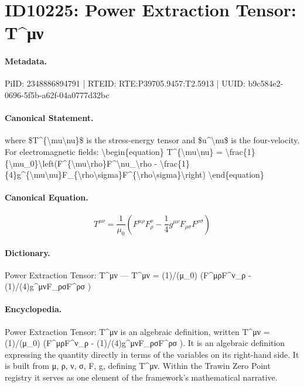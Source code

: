 \section*{ID10225: Power Extraction Tensor: T\textasciicircum{}μν}
\paragraph{Metadata.}
PiID: 2348886894791 | RTEID: RTE:P39705.9457:T2.5913 | UUID: b9c584e2-0696-5f5b-a62f-04a0777d32bc

\paragraph{Canonical Statement.}
where \$T\textasciicircum{}\{\textbackslash{}mu\textbackslash{}nu\}\$ is the stress-energy tensor and \$u\textasciicircum{}\textbackslash{}nu\$ is the four-velocity. For electromagnetic fields: \textbackslash{}begin\{equation\} T\textasciicircum{}\{\textbackslash{}mu\textbackslash{}nu\} = \textbackslash{}frac\{1\}\{\textbackslash{}mu\_0\}\textbackslash{}left(F\textasciicircum{}\{\textbackslash{}mu\textbackslash{}rho\}F\textasciicircum{}\textbackslash{}nu\_\textbackslash{}rho - \textbackslash{}frac\{1\}\{4\}g\textasciicircum{}\{\textbackslash{}mu\textbackslash{}nu\}F\_\{\textbackslash{}rho\textbackslash{}sigma\}F\textasciicircum{}\{\textbackslash{}rho\textbackslash{}sigma\}\textbackslash{}right) \textbackslash{}end\{equation\}

\paragraph{Canonical Equation.}
\[
T^{\mu\nu} = \frac{1}{\mu_0}\left(F^{\mu\rho}F^\nu_\rho - \frac{1}{4}g^{\mu\nu}F_{\rho\sigma}F^{\rho\sigma}\right)
\]

\paragraph{Dictionary.}
Power Extraction Tensor: T\textasciicircum{}μν — T\textasciicircum{}μν = (1)/(μ\_0) (F\textasciicircum{}μρF\textasciicircum{}ν\_ρ - (1)/(4)g\textasciicircum{}μνF\_ρσF\textasciicircum{}ρσ )

\paragraph{Encyclopedia.}
Power Extraction Tensor: T\textasciicircum{}μν is an algebraic definition, written T\textasciicircum{}μν = (1)/(μ\_0) (F\textasciicircum{}μρF\textasciicircum{}ν\_ρ - (1)/(4)g\textasciicircum{}μνF\_ρσF\textasciicircum{}ρσ ). It is an algebraic definition expressing the quantity directly in terms of the variables on its right-hand side. It is built from μ, ρ, ν, σ, F, g, defining T\textasciicircum{}μν. Within the Trawin Zero Point registry it serves as one element of the framework's mathematical narrative.
